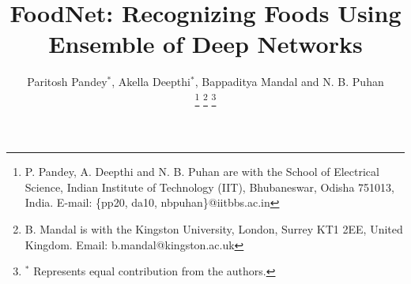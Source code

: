 \documentclass[journal]{IEEEtran}%
\begin{document}
%
\title{FoodNet: Recognizing Foods Using Ensemble of Deep Networks}
%
%
%

\author{Paritosh Pandey$^*$, Akella Deepthi$^*$, Bappaditya Mandal
        and N. B. Puhan %

\thanks{P. Pandey, A. Deepthi and N. B. Puhan are with the School of Electrical Science, Indian Institute of Technology (IIT), Bhubaneswar, Odisha 751013, India. E-mail: \{pp20, da10, nbpuhan\}@iitbbs.ac.in}%
\thanks{B. Mandal is with the Kingston University, London, Surrey KT1 2EE, United Kingdom. Email: b.mandal@kingston.ac.uk}%
\thanks{$^*$ Represents equal contribution from the authors.}
}
%
%



{}
%

\maketitle
\end{document}
